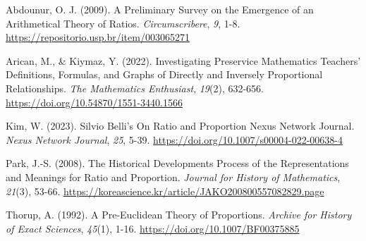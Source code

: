 \documentclass[
  stu,
  floatsintext,
  longtable,
  a4paper,
  nolmodern,
  notxfonts,
  notimes,
  colorlinks=true,linkcolor=blue,citecolor=blue,urlcolor=blue]{apa7}
\newlength{\cslhangindent}
\newenvironment{CSLReferences}[2] %
 {\begin{list}{}{%
  \setlength{\itemindent}{0pt}
  \setlength{\leftmargin}{0pt}
  \setlength{\parsep}{0pt}
  \ifodd #1
   \setlength{\leftmargin}{\cslhangindent}
   \setlength{\itemindent}{-1\cslhangindent}
  \fi
  \setlength{\itemsep}{#2\baselineskip}}}
 {\end{list}}
\begin{document}
\label{refs}
\begin{CSLReferences}{1}{0}
Abdounur, O. J. (2009). A Preliminary Survey on the Emergence of an
Arithmetical Theory of Ratios. \emph{Circumscribere}, \emph{9}, 1-8.
\url{https://repositorio.usp.br/item/003065271}

Arican, M., \& Kiymaz, Y. (2022). Investigating {Preservice Mathematics
Teachers}' {Definitions}, {Formulas}, and {Graphs} of {Directly} and
{Inversely Proportional Relationships}. \emph{The Mathematics
Enthusiast}, \emph{19}(2), 632-656.
\url{https://doi.org/10.54870/1551-3440.1566}

Kim, W. (2023). Silvio {Belli}'s {On Ratio} and {Proportion} \textbar{}
{Nexus Network Journal}. \emph{Nexus Network Journal}, \emph{25}, 5-39.
\url{https://doi.org/10.1007/s00004-022-00638-4}

Park, J.-S. (2008). The Historical Developments Process of the
Representations and Meanings for Ratio and Proportion. \emph{Journal for
History of Mathematics}, \emph{21}(3), 53-66.
\url{https://koreascience.kr/article/JAKO200800557082829.page}

Thorup, A. (1992). A Pre-Euclidean Theory of Proportions. \emph{Archive
for History of Exact Sciences}, \emph{45}(1), 1-16.
\url{https://doi.org/10.1007/BF00375885}

\end{CSLReferences}
\end{document}
